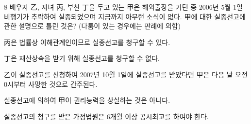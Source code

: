 \begin{question}{8}
배우자 乙, 자녀 丙, 부친 丁을 두고 있는 甲은 해외출장을 가던 중 2006년 5월 1일 비행기가 추락하여 실종되었으며 지금까지 아무런 소식이 없다. 甲에 대한 실종선고에 관한 설명으로 틀린 것은? (다툼이 있는 경우에는 판례에 의함)
\begin{choices}
  \item 丙은 법률상 이해관계인이므로 실종선고를 청구할 수 있다.
  \item 丁은 재산상속을 받기 위해 실종선고를 청구할 수 없다.
  \item 乙이 실종선고를 신청하여 2007년 10월 1일에 실종선고를 받았다면 甲은 다음 날 오전 0시부터 사망한 것으로 간주된다.
  \item 실종선고에 의하여 甲이 권리능력을 상실하는 것은 아니다.
  \item 실종선고의 청구를 받은 가정법원은 6개월 이상 공시최고를 하여야 한다.
\end{choices}
\end{question}
